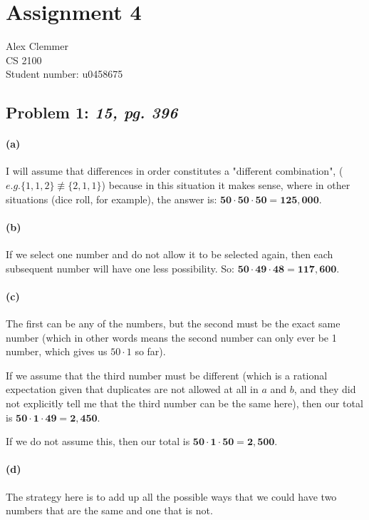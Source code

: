 \documentclass[a4paper]{article}
\begin{document}
\section*{Assignment 4}
Alex Clemmer\\
CS 2100 \\
Student number: u0458675

\subsection*{Problem 1: \textit{15, pg. 396}} 

\paragraph{(a)} I will assume that differences in order constitutes a "different combination", ($\textit{e.g.} \{1,1,2\} \not\equiv \{2,1,1\}$) because in this situation it makes sense, where in other situations (dice roll, for example), the answer is: $\mathbf{50 \cdot 50 \cdot 50 = 125,000}$.

\paragraph{(b)} If we select one number and do not allow it to be selected again, then each subsequent number will have one less possibility. So: $\mathbf{50 \cdot 49 \cdot 48 = 117,600}$.

\paragraph{(c)} The first can be any of the numbers, but the second must be the exact same number (which in other words means the second number can only ever be 1 number, which gives us $50 \cdot 1$ so far).

If we assume that the third number must be different (which is a rational expectation given that duplicates are not allowed at all in $\textit{a}$ and $\textit{b}$, and they did not explicitly tell me that the third number can be the same here), then our total is $\mathbf{50 \cdot 1 \cdot 49 = 2,450}$.

If we do not assume this, then our total is $\mathbf{ 50 \cdot 1 \cdot 50 = 2,500 }$.

\paragraph{(d)} The strategy here is to add up all the possible ways that we could have two numbers that are the same and one that is not.
\end{document}
